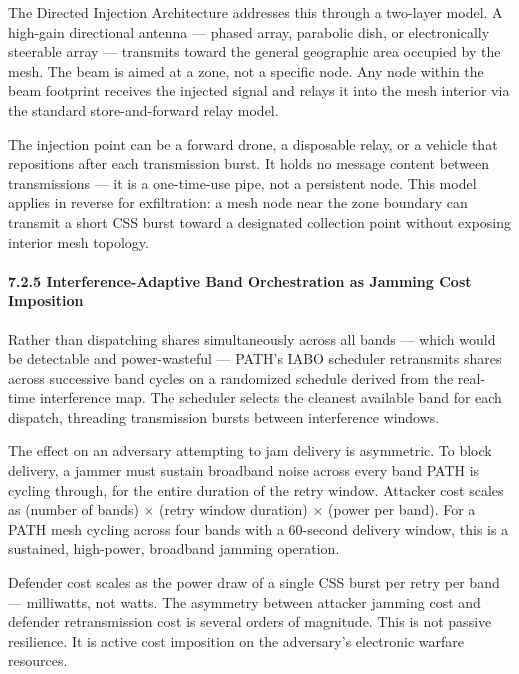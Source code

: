 \documentclass[
  11pt,
]{article}
\begin{document}
The Directed Injection Architecture addresses this through a two-layer
model. A high-gain directional antenna --- phased array, parabolic dish,
or electronically steerable array --- transmits toward the general
geographic area occupied by the mesh. The beam is aimed at a zone, not a
specific node. Any node within the beam footprint receives the injected
signal and relays it into the mesh interior via the standard
store-and-forward relay model.

The injection point can be a forward drone, a disposable relay, or a
vehicle that repositions after each transmission burst. It holds no
message content between transmissions --- it is a one-time-use pipe, not
a persistent node. This model applies in reverse for exfiltration: a
mesh node near the zone boundary can transmit a short CSS burst toward a
designated collection point without exposing interior mesh topology.

\hypertarget{interference-adaptive-band-orchestration-as-jamming-cost-imposition}{%
\paragraph{7.2.5 Interference-Adaptive Band Orchestration as Jamming
Cost
Imposition}\label{interference-adaptive-band-orchestration-as-jamming-cost-imposition}}

Rather than dispatching shares simultaneously across all bands --- which
would be detectable and power-wasteful --- PATH's IABO scheduler
retransmits shares across successive band cycles on a randomized
schedule derived from the real-time interference map. The scheduler
selects the cleanest available band for each dispatch, threading
transmission bursts between interference windows.

The effect on an adversary attempting to jam delivery is asymmetric. To
block delivery, a jammer must sustain broadband noise across every band
PATH is cycling through, for the entire duration of the retry window.
Attacker cost scales as (number of bands) × (retry window duration) ×
(power per band). For a PATH mesh cycling across four bands with a
60-second delivery window, this is a sustained, high-power, broadband
jamming operation.

Defender cost scales as the power draw of a single CSS burst per retry
per band --- milliwatts, not watts. The asymmetry between attacker
jamming cost and defender retransmission cost is several orders of
magnitude. This is not passive resilience. It is active cost imposition
on the adversary's electronic warfare resources.
\end{document}
